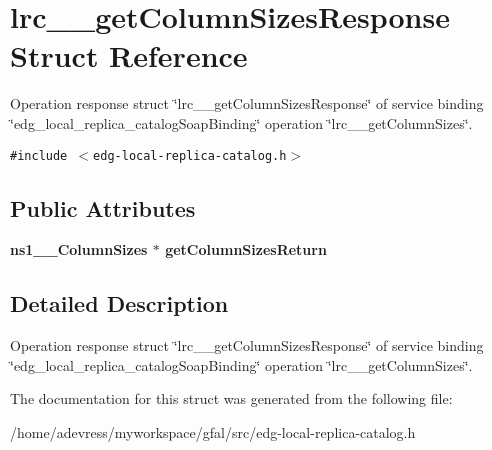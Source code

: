 \section{lrc\_\-\_\-get\-Column\-Sizes\-Response Struct Reference}
\label{structlrc____getColumnSizesResponse}
Operation response struct \char`\"{}lrc\_\-\_\-get\-Column\-Sizes\-Response\char`\"{} of service binding \char`\"{}edg\_\-local\_\-replica\_\-catalog\-Soap\-Binding\char`\"{} operation \char`\"{}lrc\_\-\_\-get\-Column\-Sizes\char`\"{}.  


{\tt \#include $<$edg-local-replica-catalog.h$>$}

\subsection*{Public Attributes}
\begin{CompactItemize}
\item 
\bf{ns1\_\-\_\-Column\-Sizes} $\ast$ \textbf{get\-Column\-Sizes\-Return}\label{structlrc____getColumnSizesResponse_381fddb0eaac4835acea878969bec034}

\end{CompactItemize}


\subsection{Detailed Description}
Operation response struct \char`\"{}lrc\_\-\_\-get\-Column\-Sizes\-Response\char`\"{} of service binding \char`\"{}edg\_\-local\_\-replica\_\-catalog\-Soap\-Binding\char`\"{} operation \char`\"{}lrc\_\-\_\-get\-Column\-Sizes\char`\"{}. 



The documentation for this struct was generated from the following file:\begin{CompactItemize}
\item 
/home/adevress/myworkspace/gfal/src/edg-local-replica-catalog.h\end{CompactItemize}
